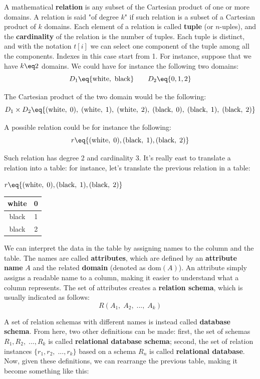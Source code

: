 A mathematical \textbf{relation} is any subset of the Cartesian product of one or more domains. A relation is said "of degree $k$" if such relation is a subset of a Cartesian product of $k$ domains. Each element of a relation is called \textbf{tuple} (or $n$-uples), and the \textbf{cardinality} of the relation is the number of tuples. Each tuple is distinct, and with the notation $t[i]$ we can select one component of the tuple among all the components. Indexes in this case start from 1.
\nwl
For instance, suppose that we have $k \eq 2$ domains. We could have for instance the following two domains:
\[ D_1 \eq \{ \text{white}, \text{ black} \} \quad \quad D_2 \eq \{ 0, 1, 2 \} \]

The Cartesian product of the two domain would be the following:
\[ D_1 \times D_2 \eq \{ (\text{white}, \; 0), \; (\text{white}, \; 1), \; (\text{white}, \; 2), \; (\text{black}, \; 0), \; (\text{black}, \; 1), \; (\text{black}, \; 2) \} \]

A possible relation could be for instance the following:
\[ r \eq \{ (\text{white}, \; 0), (\text{black}, \; 1), (\text{black}, \; 2) \} \]

Such relation has degree 2 and cardinality 3.
\nwl
It's really east to translate a relation into a table: for instance, let's translate the previous relation in a table:

\begin{center}
    $ r \eq \{ (\text{white}, \; 0), (\text{black}, \; 1), (\text{black}, \; 2) \}$ \hspace{20pt}
    \begin{tabular}{|c|c|}
        \hline
        white & 0 \\
        \hline
        black & 1 \\
        \hline
        black & 2 \\
        \hline
    \end{tabular}
\end{center}

We can interpret the data in the table by assigning names to the column and the table. The names are called \textbf{attributes}, which are defined by an \textbf{attribute name} $A$ and the related \textbf{domain} (denoted as $\text{dom}(A)$). An attribute simply assigns a readable name to a column, making it easier to understand what a column represents. The set of attributes creates a \textbf{relation schema}, which is usually indicated as follows:
\[ R(A_1, \; A_2, \; ..., \; A_k) \]

A set of relation schemas with different names is instead called \textbf{database schema}. From here, two other definitions can be made: first, the set of schemas $R_1, R_2, \;..., R_k$ is called \textbf{relational database schema}; second, the set of relation instances $\{r_1, r_2, \;..., r_k\}$ based on a schema $R_n$ is called \textbf{relational database}. Now, given these definitions, we can rearrange the previous table, making it become something like this:

